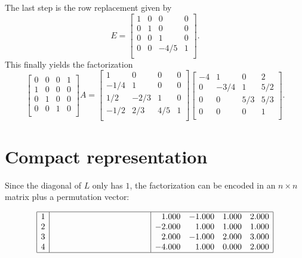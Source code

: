 \documentclass[11pt]{article}
\newcommand{\1}{\mathbf{1}}
\newcommand{\0}{\mathbf{0}}
\begin{document}
The last step is the row replacement given by
\[
E =
\begin{bmatrix}
  1	&  0	&  0	&  0 \\
  0	&  1	&  0	&  0 \\
  0	&  0	&  1	&  0 \\
  0	&  0	& -4/5	&  1 \\
\end{bmatrix}
.
\]
This finally yields the factorization
\[
\begin{bmatrix}
  0	&  0	&  0	&  1 \\
  1	&  0	&  0	&  0 \\
  0	&  1	&  0	&  0 \\
  0	&  0	&  1	&  0 \\
\end{bmatrix}
A
=
\begin{bmatrix}
  1	&  0	&  0	&  0 \\
 -1/4	&  1	&  0	&  0 \\
  1/2	& -2/3	&  1	&  0 \\
 -1/2	&  2/3	&  4/5	&  1 \\
\end{bmatrix}
\begin{bmatrix}
 -4	&  1	&  0	&  2 \\
  0	& -3/4	&  1	&  5/2 \\
  0	&  0	&  5/3	&  5/3 \\
  0	&  0	&  0	&  1 \\
\end{bmatrix}
.
\]

\section*{Compact representation}

Since the diagonal of $L$ only has $1$, the factorization can be encoded in an $n \times n$ matrix plus a permutation vector:

\[
\begin{array}{|r|rrr|rrrr|}
\hline
  1	& \phantom{-0.000}&\phantom{-0.000}&\phantom{-0.000}&  1.000	& -1.000	&  1.000	&  2.000 \\
  2	& 		& 		&		& -2.000	&  1.000	&  1.000	&  1.000 \\
  3	& 		& 		&  		&  2.000	& -1.000	&  2.000	&  3.000 \\
  4	& 		& 		& 		& -4.000	&  1.000	&  0.000	&  2.000 \\
\hline
\end{array}
\]
\end{document}

